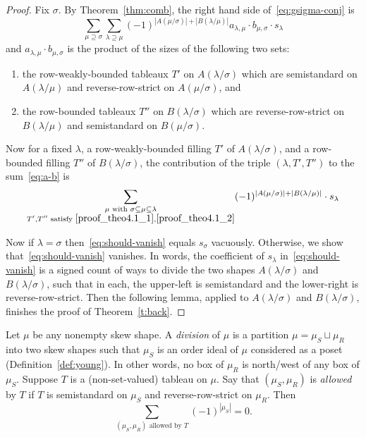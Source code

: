\documentclass[ALCO,ThmDefs,Unicode,epreuves]{cedram}
\begin{document}
\begin{proof}
Fix $\sigma$. By Theorem~\ref{thm:comb}, the right hand side of~\eqref{eq:gsigma-conj} is
\begin{equation}\label{eq:a-b}
\sum_{\mu\supseteq \sigma} \sum_{\lambda\supseteq \mu} (-1)^{|A(\mu/\sigma)|+|B(\lambda/\mu)|} a_{\lambda,\mu} \cdot b_{\mu,\sigma} \cdot s_\lambda
\end{equation}
and $a_{\lambda,\mu} \cdot b_{\mu,\sigma}$ is the product of the sizes of the following two sets:
\begin{enumerate}
\item\label{proof_theo4.1_1} the row-weakly-bounded tableaux $T'$ on $A(\lambda/\sigma)$ which are semistandard on $A(\lambda/\mu)$ and reverse-row-strict on $A(\mu/\sigma)$, and
\item\label{proof_theo4.1_2} the row-bounded tableaux $T''$ on $B(\lambda/\sigma)$ which are reverse-row-strict on $B(\lambda/\mu)$ and semistandard on $B(\mu/\sigma)$.
\end{enumerate} 

Now for a fixed $\lambda$, a row-weakly-bounded filling $T'$ of $A(\lambda/\sigma)$, and a row-bounded filling $T''$ of $B(\lambda/\sigma)$, the contribution of the triple $(\lambda,T',T'')$ to the sum~\eqref{eq:a-b} is
\begin{equation}\label{eq:should-vanish}
\sum_{\substack{\mu\text{ with } \sigma\subseteq \mu\subseteq \lambda \\T',T''\text{ satisfy }\eqref{proof_theo4.1_1},\eqref{proof_theo4.1_2}}}
 (-1)^{|A(\mu/\sigma)|+|B(\lambda/\mu)|}\cdot s_\lambda
 \end{equation}

Now if $\lambda = \sigma$ then~\eqref{eq:should-vanish} equals $s_\sigma$ vacuously. Otherwise, we show that~\eqref{eq:should-vanish} vanishes. In words, the coefficient of $s_\lambda$ in~\eqref{eq:should-vanish} is a signed count of ways to divide the two shapes $A(\lambda/\sigma)$ and $B(\lambda/\sigma)$, such that in each, the upper-left is semistandard and the lower-right is reverse-row-strict. Then the following lemma, applied to $A(\lambda/\sigma)$ and $B(\lambda/\sigma)$, finishes the proof of Theorem~\ref{t:back}. 
\end{proof}

\begin{lemma}\label{lem:ss-rrs}
Let $\mu$ be any nonempty skew shape. A \emph{division} of $\mu$ is a partition $\mu = \mu_S \sqcup \mu_R$ into two skew shapes such that $\mu_S$ is an order ideal of $\mu$ considered as a poset (Definition~\ref{def:young}). In other words, no box of $\mu_R$ is north/west of any box of $\mu_S$.
Suppose $T$ is a (non-set-valued) tableau on $\mu$. Say that $(\mu_S,\mu_R)$ is \emph{allowed} by $T$ if $T$ is semistandard on $\mu_S$ and reverse-row-strict on $\mu_R$. Then
\[
\sum_{(\mu_S,\mu_R) \text{ allowed by }T} (-1)^{|\mu_S|} = 0.
\]
\end{lemma}
\end{document}
